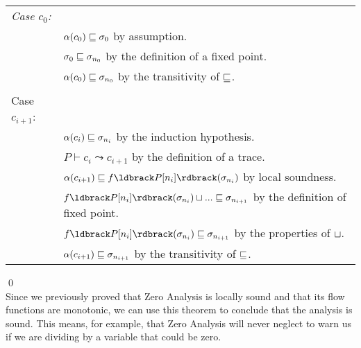 \documentclass[11pt]{article}
\begin{document}
\begin{tabular}{ll}
\emph{Case $c_0$:} & \\
& $\alpha(c_0) \sqsubseteq \sigma_0$ by assumption. \\
& $\sigma_0 \sqsubseteq \sigma_{n_0}$ by the definition of a fixed point. \\
& $\alpha(c_0) \sqsubseteq \sigma_{n_0}$ by the transitivity of $\sqsubseteq$.\\

\\

Case $c_{i+1}$: & \\
& $\alpha(c_i) \sqsubseteq \sigma_{n_i}$ by the induction hypothesis. \\
& $P \vdash c_i \leadsto c_{i+1}$ by the definition of a trace. \\
& $\alpha(c_{i+1}) \alap f\parg{P[n_i]}(\sigma_{n_i})$ by local soundness. \\
& $f\parg{P[n_i]}(\sigma_{n_i}) \join ... \alap \sigma_{n_{i+1}}$ by the definition of fixed point. \\
& $f\parg{P[n_i]}(\sigma_{n_i}) \alap \sigma_{n_{i+1}}$ by the properties of $\sqcup$. \\
& $\alpha(c_{i+1}) \sqsubseteq \sigma_{n_{i+1}}$ by the transitivity of $\sqsubseteq$. \\
\end{tabular}

\qed\\[1ex]

Since we previously proved that Zero Analysis is locally sound and that its flow functions are monotonic, we can use this theorem to conclude that the analysis is sound.  This means, for example, that Zero Analysis will never neglect to warn us if we are dividing by a variable that could be zero.
\end{document}
